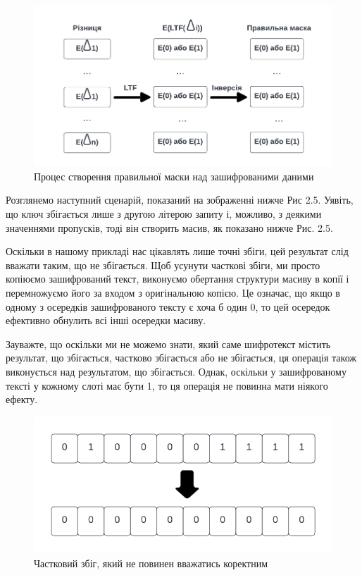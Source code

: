 \begin{itemize}
{\begin{figure}[!ht]
    \centering
    \label{fig:mask-creation-flow}
    \includegraphics[scale=1.25]{static/mask-creation-flow.png}
    \caption{Процес створення правильної маски над зашифрованими даними}
\end{figure}
Розглянемо наступний сценарій, показаний на зображенні нижче Рис 2.5. Уявіть, що ключ збігається лише з
другою літерою запиту і, можливо, з деякими значеннями пропусків, тоді він створить масив, як
показано нижче Рис. 2.5.

Оскільки в нашому прикладі нас цікавлять лише точні збіги, цей результат слід вважати таким, що
не збігається. Щоб усунути часткові збіги, ми просто копіюємо зашифрований текст, виконуємо
обертання структури масиву в копії і перемножуємо його за входом з оригінальною копією. Це
означає, що якщо в одному з осередків зашифрованого тексту є хоча б один 0, то цей осередок
ефективно обнулить всі інші осередки масиву.

Зауважте, що оскільки ми не можемо знати, який саме шифротекст містить результат, що збігається,
частково збігається або не збігається, ця операція також виконується над результатом, що
збігається. Однак, оскільки у зашифрованому тексті у кожному слоті має бути 1, то ця операція не
повинна мати ніякого ефекту.

\begin{figure}[!ht]
    \centering
    \label{fig:partial-match}
    \includegraphics{static/partial-match.png}
    \caption{Частковий збіг, який не повинен вважатись коректним}
\end{figure}

}
\end{itemize}
